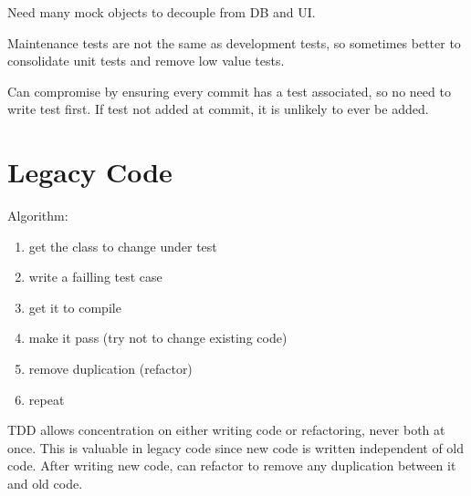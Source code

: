 \documentclass[11pt]{article}
\begin{document}
Need many mock objects to decouple from DB and UI.

Maintenance tests are not the same as development tests, so sometimes better to consolidate
unit tests and remove low value tests.

Can compromise by ensuring every commit has a test associated, so no need to write test first.
If test not added at commit, it is unlikely to ever be added.
\section{Legacy Code}
\label{sec:org47b2a2d}
Algorithm:
\begin{enumerate}
\item get the class to change under test
\item write a failling test case
\item get it to compile
\item make it pass (try not to change existing code)
\item remove duplication (refactor)
\item repeat
\end{enumerate}

TDD allows concentration on either writing code or refactoring, never both at once.
This is valuable in legacy code since new code is written independent of old code.
After writing new code, can refactor to remove any duplication between it and old code.
\end{document}
